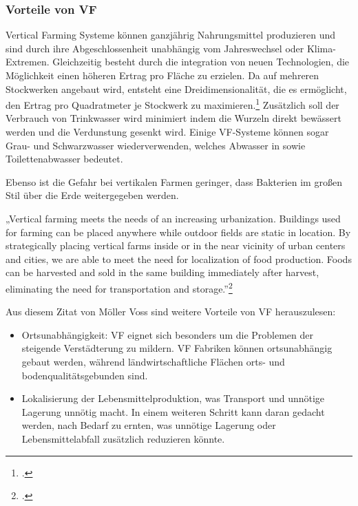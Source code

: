 \documentclass{scrartcl}
\begin{document}
\subsubsection{Vorteile von VF}

Vertical Farming Systeme können ganzjährig Nahrungsmittel produzieren und sind durch ihre Abgeschlossenheit unabhängig vom Jahreswechsel oder Klima-Extremen. Gleichzeitig besteht durch die integration von neuen Technologien, die Möglichkeit einen höheren Ertrag pro Fläche zu erzielen. Da auf mehreren Stockwerken angebaut wird, entsteht eine Dreidimensionalität, die es ermöglicht, den Ertrag pro Quadratmeter je Stockwerk zu maximieren.\footcite{Despommier2010TheCentury.} Zusätzlich soll der Verbrauch von Trinkwasser wird minimiert indem die Wurzeln direkt bewässert werden und die Verdunstung gesenkt wird. Einige VF-Systeme können sogar Grau- und Schwarzwasser wiederverwenden, welches Abwasser in sowie Toilettenabwasser bedeutet. 

Ebenso ist die Gefahr bei vertikalen Farmen geringer, dass Bakterien im großen Stil über die Erde weitergegeben werden.

\begin{displayquote}
„Vertical farming meets the needs of an increasing urbanization. Buildings used for farming can be placed anywhere while outdoor fields are static in location. By strategically placing vertical farms inside or in the near vicinity of urban centers and cities, we are able to meet the need for localization of food production. Foods can be harvested and sold in the same building immediately after harvest, eliminating the need for transportation and storage.”\footcite[S.7]{PeterMollerVoss2013VerticalRise}
\end{displayquote}

Aus diesem Zitat von Möller Voss sind weitere Vorteile von VF herauszulesen:

\begin{itemize}
    \item Ortsunabhängigkeit: VF eignet sich besonders um die Problemen der steigende Verstädterung zu mildern. VF Fabriken können ortsunabhängig gebaut werden, während  ländwirtschaftliche Flächen orts- und bodenqualitätsgebunden sind.
    \item Lokalisierung der Lebensmittelproduktion, was Transport und unnötige Lagerung unnötig macht. In einem weiteren Schritt kann daran gedacht werden, nach Bedarf zu ernten, was unnötige Lagerung oder Lebensmittelabfall zusätzlich reduzieren könnte.
\end{itemize}
\end{document}

